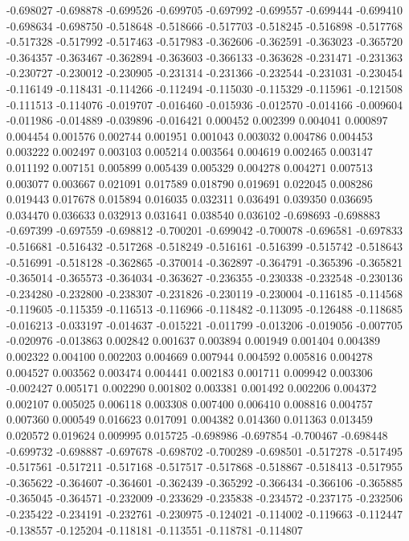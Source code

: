 -0.698027
-0.698878
-0.699526
-0.699705
-0.697992
-0.699557
-0.699444
-0.699410
-0.698634
-0.698750
-0.518648
-0.518666
-0.517703
-0.518245
-0.516898
-0.517768
-0.517328
-0.517992
-0.517463
-0.517983
-0.362606
-0.362591
-0.363023
-0.365720
-0.364357
-0.363467
-0.362894
-0.363603
-0.366133
-0.363628
-0.231471
-0.231363
-0.230727
-0.230012
-0.230905
-0.231314
-0.231366
-0.232544
-0.231031
-0.230454
-0.116149
-0.118431
-0.114266
-0.112494
-0.115030
-0.115329
-0.115961
-0.121508
-0.111513
-0.114076
-0.019707
-0.016460
-0.015936
-0.012570
-0.014166
-0.009604
-0.011986
-0.014889
-0.039896
-0.016421
0.000452
0.002399
0.004041
0.000897
0.004454
0.001576
0.002744
0.001951
0.001043
0.003032
0.004786
0.004453
0.003222
0.002497
0.003103
0.005214
0.003564
0.004619
0.002465
0.003147
0.011192
0.007151
0.005899
0.005439
0.005329
0.004278
0.004271
0.007513
0.003077
0.003667
0.021091
0.017589
0.018790
0.019691
0.022045
0.008286
0.019443
0.017678
0.015894
0.016035
0.032311
0.036491
0.039350
0.036695
0.034470
0.036633
0.032913
0.031641
0.038540
0.036102
-0.698693
-0.698883
-0.697399
-0.697559
-0.698812
-0.700201
-0.699042
-0.700078
-0.696581
-0.697833
-0.516681
-0.516432
-0.517268
-0.518249
-0.516161
-0.516399
-0.515742
-0.518643
-0.516991
-0.518128
-0.362865
-0.370014
-0.362897
-0.364791
-0.365396
-0.365821
-0.365014
-0.365573
-0.364034
-0.363627
-0.236355
-0.230338
-0.232548
-0.230136
-0.234280
-0.232800
-0.238307
-0.231826
-0.230119
-0.230004
-0.116185
-0.114568
-0.119605
-0.115359
-0.116513
-0.116966
-0.118482
-0.113095
-0.126488
-0.118685
-0.016213
-0.033197
-0.014637
-0.015221
-0.011799
-0.013206
-0.019056
-0.007705
-0.020976
-0.013863
0.002842
0.001637
0.003894
0.001949
0.001404
0.004389
0.002322
0.004100
0.002203
0.004669
0.007944
0.004592
0.005816
0.004278
0.004527
0.003562
0.003474
0.004441
0.002183
0.001711
0.009942
0.003306
-0.002427
0.005171
0.002290
0.001802
0.003381
0.001492
0.002206
0.004372
0.002107
0.005025
0.006118
0.003308
0.007400
0.006410
0.008816
0.004757
0.007360
0.000549
0.016623
0.017091
0.004382
0.014360
0.011363
0.013459
0.020572
0.019624
0.009995
0.015725
-0.698986
-0.697854
-0.700467
-0.698448
-0.699732
-0.698887
-0.697678
-0.698702
-0.700289
-0.698501
-0.517278
-0.517495
-0.517561
-0.517211
-0.517168
-0.517517
-0.517868
-0.518867
-0.518413
-0.517955
-0.365622
-0.364607
-0.364601
-0.362439
-0.365292
-0.366434
-0.366106
-0.365885
-0.365045
-0.364571
-0.232009
-0.233629
-0.235838
-0.234572
-0.237175
-0.232506
-0.235422
-0.234191
-0.232761
-0.230975
-0.124021
-0.114002
-0.119663
-0.112447
-0.138557
-0.125204
-0.118181
-0.113551
-0.118781
-0.114807
